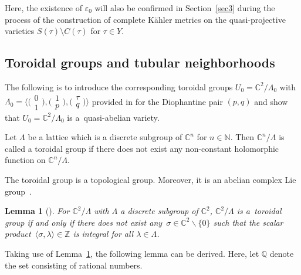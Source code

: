 \documentclass[pdftex]{sigma}
\numberwithin{equation}{section}
\newtheorem{Lemma}[Theorem]{Lemma}
\begin{document}
Here, the existence of $\varepsilon_0$ will also be confirmed in Section~\ref{sec3} during the process of the construction of complete K\"ahler metrics on the quasi-projective varieties $S(\tau)\setminus C(\tau)$ for $\tau \in Y$.

\subsection{Toroidal groups and tubular neighborhoods}

The following is to introduce the corresponding toroidal groups $U_0=\mathbb{C}^2/\Lambda_0$ with
$\Lambda_0=\big\langle\big(\begin{smallmatrix}0 \\1\end{smallmatrix}\big),\allowbreak\big(\begin{smallmatrix}1 \\p\end{smallmatrix}\big),\big(\begin{smallmatrix}\tau \\q\end{smallmatrix}\big)\big\rangle$
provided in \cite{Takayuki-Takato2} for the Diophantine pair $(p,q)$ and show that $U_0=\mathbb{C}^2/\Lambda_0$ is a~quasi-abelian variety.

\begin{Definition} \label{Definition2.10}
 Let $\Lambda$ be a lattice which is a discrete subgroup of $\mathbb{C}^n$ for $n\in \mathbb{N}$. Then $\mathbb{C}^n/\Lambda$ is called a toroidal group if there does not exist any non-constant holomorphic function on $\mathbb{C}^n/\Lambda$.
\end{Definition}

The toroidal group is a topological group. Moreover, it is an abelian complex Lie group~\cite{Yukitaka-Klaus}.

\begin{Lemma}[{\cite[Theorem~1.1.4]{Yukitaka-Klaus}}] \label{Lemma2.11}
 For $\mathbb{C}^2/\Lambda$ with $\Lambda$ a discrete subgroup of $\mathbb{C}^2$, $\mathbb{C}^2/\Lambda$ is a~toroidal group if and only if there does not exist any~${\sigma \in \mathbb{C}^2 \backslash \{ 0 \}}$ such that the scalar product~${\langle \sigma,\lambda \rangle \in \mathbb{Z}}$ is integral for all $ \lambda \in \Lambda $.
\end{Lemma}

Taking use of Lemma~\ref{Lemma2.11}, the following lemma can be derived. Here, let $\mathbb{Q}$ denote the set consisting of rational numbers.
\end{document}
